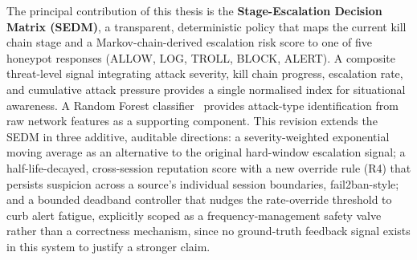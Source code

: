 The principal contribution of this thesis is the
\textbf{Stage-Escalation Decision Matrix (SEDM)}, a transparent, deterministic
policy that maps the current kill chain stage and a Markov-chain-derived
escalation risk score to one of five honeypot responses
(ALLOW, LOG, TROLL, BLOCK, ALERT).
A composite threat-level signal integrating attack severity, kill chain
progress, escalation rate, and cumulative attack pressure provides a
single normalised index for situational awareness.
A Random Forest classifier~\citep{breiman2001random} provides attack-type
identification from raw network features as a supporting component.
This revision extends the SEDM in three additive, auditable directions: a
severity-weighted exponential moving average as an alternative to the
original hard-window escalation signal; a half-life-decayed, cross-session
reputation score with a new override rule (R4) that persists suspicion
across a source's individual session boundaries, fail2ban-style; and a
bounded deadband controller that nudges the rate-override threshold to
curb alert fatigue, explicitly scoped as a frequency-management safety
valve rather than a correctness mechanism, since no ground-truth feedback
signal exists in this system to justify a stronger claim.

